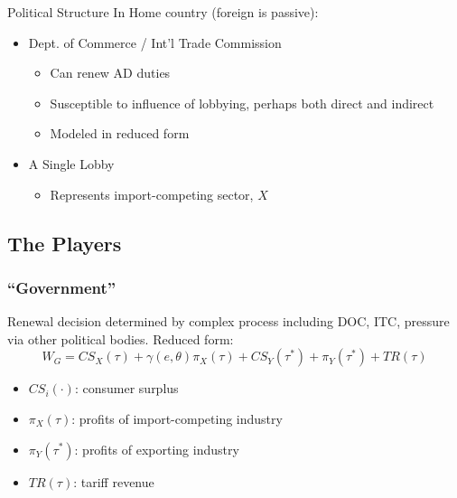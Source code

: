 \documentclass[handout]{beamer}
\newcommand{\ga}{\gamma}
\newcommand{\ta}{\theta}
\begin{document}
\begin{frame}{Political Structure}
In Home country (foreign is passive):
\pause
\begin{itemize}[<+->]
	\item Dept. of Commerce / Int'l Trade Commission
		\begin{itemize}[<+->]
			\item Can renew AD duties
			\item Susceptible to influence of lobbying, perhaps both direct and indirect
			\item Modeled in reduced form
		\end{itemize}
	\item A Single Lobby
		\begin{itemize}
			\item Represents import-competing sector, $X$
		\end{itemize}	
\end{itemize}

\end{frame}


\subsection{The Players}
\begin{frame}
\frametitle{``Government''}
Renewal decision determined by complex process including DOC, ITC, pressure via other political bodies. Reduced form:
\[
  W_G = \mathit{CS}_X(\tau) + \ga(e,\ta) \pi_X(\tau) + \mathit{CS}_Y(\tau^*) + \pi_Y(\tau^*) + \mathit{TR}(\tau)
\]

\begin{itemize}
	\item $\mathit{CS_i(\cdot)}$: consumer surplus
	\item $\pi_X(\tau)$: profits of import-competing industry
	\item $\pi_Y(\tau^*)$: profits of exporting industry
	\item $\mathit{TR}(\tau)$: tariff revenue
\end{itemize}
\end{frame}
\end{document}
